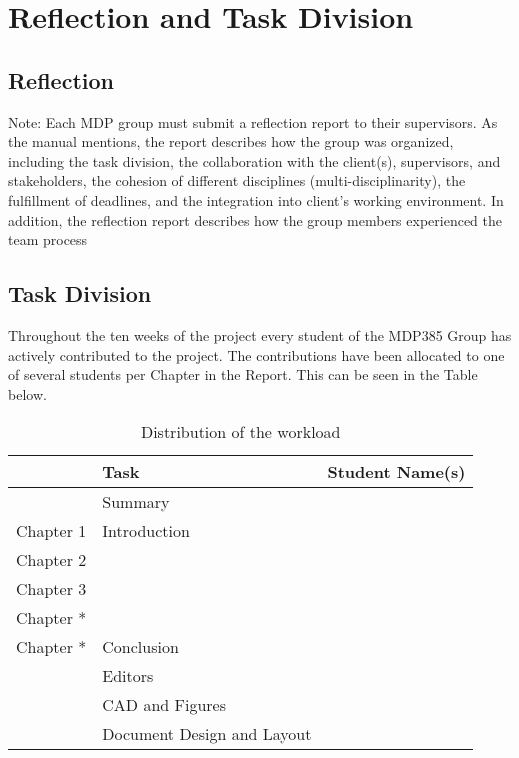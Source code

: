 \chapter{Reflection and Task Division}
\label{chapter:Reflection and Task Division}

\section{Reflection}
Note:  Each MDP group must submit a reflection report to their supervisors. As the manual mentions, the report describes how the group was organized, including the task division, the collaboration with the client(s), supervisors, and stakeholders, the cohesion of different disciplines (multi-disciplinarity), the fulfillment of deadlines, and the integration into client’s working environment. In addition, the reflection report describes how the group members experienced the team process

\section{Task Division}

Throughout the ten weeks of the project every student of the MDP385 Group has actively contributed to the project. 
The contributions have been allocated to one of several students per Chapter in the Report. This can be seen in the Table below.

\begin{table}[htb]
    \setlength\extrarowheight{4pt}
    \centering
    \caption{Distribution of the workload}
    \label{tab:taskdivision}
    \begin{tabularx}{\textwidth}{lXX}
        \toprule
        & Task & Student Name(s) \\
        \midrule
        & Summary & \\
        Chapter 1 & Introduction &  \\
        Chapter 2 &  & \\
        Chapter 3 &  & \\
        Chapter * &  & \\
        Chapter * & Conclusion &  \\
        \midrule
        & Editors & \\
        & CAD and Figures & \\
        & Document Design and Layout & \\
        \bottomrule
    \end{tabularx}
\end{table}
